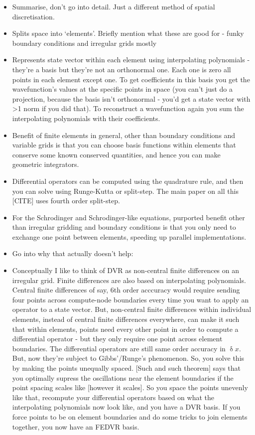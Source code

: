 \begin{itemize}
    \item Summarise, don't go into detail. Just a different method of spatial discretisation.
    \item{Splits space into `elements'. Briefly mention what these are good for - funky boundary conditions and irregular grids mostly}
    \item Represents state vector within each element using interpolating polynomials - they're a basis but they're not an orthonormal one. Each one is zero all points in each element except one. To get coefficients in this basis you get the wavefunction's values at the specific points in space (you can't just do a projection, because the basis isn't orthonormal - you'd get a state vector with >1 norm if you did that). To reconstruct a wavefunction again you sum the interpolating polynomials with their coefficients.
    \item Benefit of finite elements in general, other than boundary conditions and variable grids is that you can choose basis functions within elements that conserve some known conserved quantities, and hence you can make geometric integrators.
    \item Differential operators can be computed using the quadrature rule, and then you can solve using Runge-Kutta or split-step. The main paper on all this [CITE] uses fourth order split-step.
    \item For the Schrodinger and Schrodinger-like equations, purported benefit other than irregular gridding and boundary conditions is that you only need to exchange one point between elements, speeding up parallel implementations.
    \item Go into why that actually doesn't help:
    \item Conceptually I like to think of DVR as non-central finite differences on an irregular grid. Finite differences are also based on interpolating polynomials. Central finite differences of say, 6th order acccuracy would require sending four points across compute-node boundaries every time you want to apply an operator to a state vector. But, non-central finite differences within individual elements, instead of central finite differences everywhere, can make it such that within elements, points need every other point in order to compute a differential operator - but they only require one point across element boundaries. The differential operators are still same order accuracy in $\updelta x$. But, now they're subject to Gibbs'/Runge's phenomenon. So, you solve this by making the points unequally spaced. [Such and such theorem] says that you optimally supress the oscillations near the element boundaries if the point spacing scales like [however it scales]. So you space the points unevenly like that, recompute your differential operators based on what the interpolating polynomials now look like, and you have a DVR basis. If you force points to be on element boundaries and do some tricks to join elements together, you now have an FEDVR basis.

\end{itemize}

